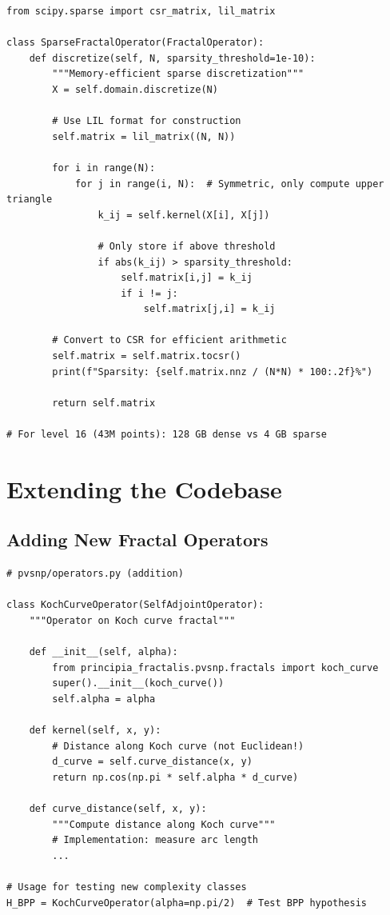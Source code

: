 \begin{verbatim}
from scipy.sparse import csr_matrix, lil_matrix

class SparseFractalOperator(FractalOperator):
    def discretize(self, N, sparsity_threshold=1e-10):
        """Memory-efficient sparse discretization"""
        X = self.domain.discretize(N)

        # Use LIL format for construction
        self.matrix = lil_matrix((N, N))

        for i in range(N):
            for j in range(i, N):  # Symmetric, only compute upper triangle
                k_ij = self.kernel(X[i], X[j])

                # Only store if above threshold
                if abs(k_ij) > sparsity_threshold:
                    self.matrix[i,j] = k_ij
                    if i != j:
                        self.matrix[j,i] = k_ij

        # Convert to CSR for efficient arithmetic
        self.matrix = self.matrix.tocsr()
        print(f"Sparsity: {self.matrix.nnz / (N*N) * 100:.2f}%")

        return self.matrix

# For level 16 (43M points): 128 GB dense vs 4 GB sparse
\end{verbatim}

\section{Extending the Codebase}
\label{sec:extending}

\subsection{Adding New Fractal Operators}

\begin{verbatim}
# pvsnp/operators.py (addition)

class KochCurveOperator(SelfAdjointOperator):
    """Operator on Koch curve fractal"""

    def __init__(self, alpha):
        from principia_fractalis.pvsnp.fractals import koch_curve
        super().__init__(koch_curve())
        self.alpha = alpha

    def kernel(self, x, y):
        # Distance along Koch curve (not Euclidean!)
        d_curve = self.curve_distance(x, y)
        return np.cos(np.pi * self.alpha * d_curve)

    def curve_distance(self, x, y):
        """Compute distance along Koch curve"""
        # Implementation: measure arc length
        ...

# Usage for testing new complexity classes
H_BPP = KochCurveOperator(alpha=np.pi/2)  # Test BPP hypothesis
\end{verbatim}

